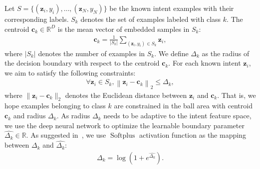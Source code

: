 \documentclass[letterpaper]{article} %
\begin{document}
Let $S=\{(\boldsymbol{z}_i, y_{i}),\ldots, (\boldsymbol{z}_N, y_{N})\}$ be the known intent examples with their corresponding labels. $S_{k}$ denotes the set of examples labeled with class $k$. The centroid $\boldsymbol{c}_{k} \in \mathds  R^{D}$ is the mean vector of embedded samples in $S_{k}$:
\begin{align}
\boldsymbol{c}_{k}=\frac{1}{\left|S_{k}\right|} \sum_{\left(\boldsymbol{z}_i, y_{i}\right) \in S_{k}} \boldsymbol{z}_i,
\label{center}
\end{align}
where $|S_{k}|$ denotes the number of examples in $S_{k}$. We define $\Delta_{k}$ as the radius of the decision boundary with respect to the centroid $\boldsymbol{c}_{k}$. For each known intent $\boldsymbol{z}_{i}$, we aim to satisfy the following constraints:
\begin{align}
\forall \boldsymbol{z}_{i} \in S_{k},  \left\|\boldsymbol{z}_{i}-\boldsymbol{c}_{k}\right\|_{2} \leq \Delta_{k},
\end{align}
where $\|\boldsymbol{z}_{i}-\boldsymbol{c}_{k}\|_{2}$ denotes the Euclidean distance between $\boldsymbol{z}_{i}$ and $\boldsymbol{c}_k$. That is, we hope examples belonging to class $k$ are constrained in the ball area with centroid $\boldsymbol{c}_{k}$ and radius $\Delta_{k}$. As radius $\Delta_{k}$ needs to be adaptive to the intent feature space, we use the deep neural network to optimize
the learnable boundary parameter $\widehat{\Delta_{k}} \in \mathds R$. As suggested in~\cite{tapaswi2019video}, we use $\operatorname{Softplus}$ activation function as the mapping between $\Delta_{k}$ and $\widehat{\Delta_{k}}$:
\begin{align}
\Delta_{k}=\log \left(1+e^{\widehat{\Delta_{k}}}\right).
\label{delta}
\end{align}
\end{document}
